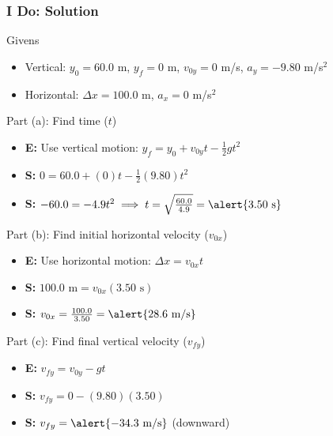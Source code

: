 \documentclass{beamer}
\begin{document}
\begin{frame}[fragile]
\frametitle{I Do: Solution}
\begin{block}{Givens}
\begin{itemize}
    \item Vertical: $y_0 = 60.0$ m, $y_f = 0$ m, $v_{0y} = 0$ m/s, $a_y = -9.80$ m/s$^2$
    \item Horizontal: $\Delta x = 100.0$ m, $a_x = 0$ m/s$^2$
\end{itemize}
\end{block}
\pause
\begin{block}{Part (a): Find time ($t$)}
\begin{itemize}
    \item \textbf{E:} Use vertical motion: $y_f = y_0 + v_{0y}t - \frac{1}{2}gt^2$
    \item \textbf{S:} $0 = 60.0 + (0)t - \frac{1}{2}(9.80)t^2$
    \item \textbf{S:} $-60.0 = -4.9t^2 \implies t = \sqrt{\frac{60.0}{4.9}} = \alert{3.50 \text{ s}}$
\end{itemize}
\end{block}
\pause
\begin{block}{Part (b): Find initial horizontal velocity ($v_{0x}$)}
\begin{itemize}
    \item \textbf{E:} Use horizontal motion: $\Delta x = v_{0x} t$
    \item \textbf{S:} $100.0 \text{ m} = v_{0x} (3.50 \text{ s})$
    \item \textbf{S:} $v_{0x} = \frac{100.0}{3.50} = \alert{28.6 \text{ m/s}}$
\end{itemize}
\end{block}
\end{frame}

\begin{frame}
\begin{block}{Part (c): Find final vertical velocity ($v_{fy}$)}
\begin{itemize}
    \item \textbf{E:} $v_{fy} = v_{0y} - gt$
    \item \textbf{S:} $v_{fy} = 0 - (9.80)(3.50)$
    \item \textbf{S:} $v_{fy} = \alert{-34.3 \text{ m/s}}$ (downward)
\end{itemize}
\end{block}
\end{frame}
\end{document}
